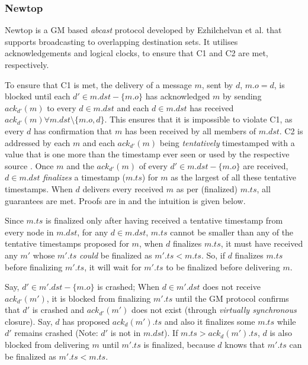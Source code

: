         \subsubsection{Newtop}
        Newtop \citep{Ezhilchelvan:1995:NFG:876885.880005} is a GM based \emph{abcast} protocol developed by Ezhilchelvan et al. that supports broadcasting to overlapping destination sets.  It utilises acknowledgements and logical clocks, to ensure that C1 and C2 are met, respectively.  
        
        To ensure that C1 is met, the delivery of a message $m$, sent by $d$, $m.o=d$, is blocked until each $d' \in m.dst-\{m.o\}$ has acknowledged $m$ by sending $ack_{d'}(m)$ to every $d \in m.dst$ and each $d \in m.dst$ has received $ack_{d'}(m) \forall m.dst \setminus \{m.o,d\}$.  This ensures that it is impossible to violate C1, as every $d$ has confirmation that $m$ has been received by all members of $m.dst$.  
        C2 is addressed by each $m$ and each $ack_{d'}(m)$ being \emph{tentatively} timestamped with a value that is one more than the timestamp ever seen or used by the respective source \cite{Lamport:1978:TCO:359545.359563}. Once $m$ and the $ack_{d'}(m)$ of every $d'\in m.dst-\{m.o\}$ are received, $d \in m.dst$ \emph{finalizes} a timestamp ($m.ts$) for $m$ as the largest of all these tentative timestamps. When $d$ delivers every received $m$ as per (finalized) $m.ts$, all guarantees are met. Proofs are in \cite{Lamport:1978:TCO:359545.359563, Birman:1991:LCA:128738.128742, Ezhilchelvan:1995:NFG:876885.880005} and the intuition is given below.
        
        Since $m.ts$ is finalized only after having received a tentative timestamp from every node in $m.dst$, for any $d \in m.dst$, $m.ts$ cannot be smaller than any of the tentative timestamps proposed for $m$, when $d$ finalizes $m.ts$, it must have received any $m'$ whose $m'.ts$ \emph{could} be finalized as $m'.ts < m.ts$. So, if $d$ finalizes $m.ts$ before finalizing $m'.ts$, it will wait for $m'.ts$ to be finalized before delivering $m$.
        
        Say, $d' \in m'.dst - \{m.o\}$ is crashed; When $d \in m'.dst$ does not receive $ack_{d'}(m')$, it is blocked from finalizing $m'.ts$ until the GM protocol confirms that $d'$ is crashed and $ack_{d'}(m')$ does not exist (through \emph{virtually synchronous} closure). Say, $d$ has proposed $ack_d(m').ts$ and also it finalizes some $m.ts$ while $d'$ remains crashed (Note: $d'$ is not in $m.dst$). If $m.ts > ack_d(m').ts$, $d$ is also blocked from delivering $m$ until $m'.ts$ is finalized, because $d$ knows that $m'.ts$ can be finalized as $m'.ts < m.ts$.

